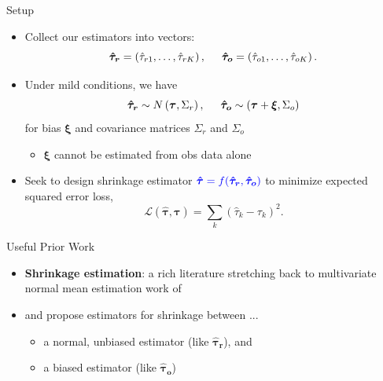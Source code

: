 \documentclass[usenames,dvipsnames]{beamer}
\newcommand{\bstau}{\boldsymbol{\tau}}
\newcommand{\hbstau}{\boldsymbol{\hat \tau}}
\newcommand{\htaur}{\boldsymbol{\hat \tau_r}}
\newcommand{\htauo}{\boldsymbol{\hat \tau_o}}
\let\oldcite=\cite
\renewcommand{\cite}[1]{\textcolor[rgb]{.3,.3,.8}{\oldcite{#1}}}
\theoremstyle{definition} %
\begin{document}
\begin{frame}{Setup}
\begin{itemize}
\item Collect our estimators into vectors:
\[\boldsymbol{\hat \tau_r }= \left(\hat \tau_{r1}, \dots, \hat \tau_{rK} \right), \hspace{5mm}   \boldsymbol{\hat \tau_{o}} = \left(\hat \tau_{o1}, \dots, \hat \tau_{oK} \right). \] \pause
\item Under mild conditions, we have 
\[ \boldsymbol{\hat \tau_{r}} \sim N\left( \boldsymbol{\tau}, \Sigma_r \right) , \hspace{5mm}  \boldsymbol{\hat \tau_{o}} \sim \left( \boldsymbol{\tau} + \boldsymbol{\xi}, \Sigma_o \right) \] 
for bias $\boldsymbol{\xi}$ and covariance matrices $\Sigma_r$ and $\Sigma_o$
\begin{itemize}
\item $\boldsymbol{\xi}$ cannot be estimated from obs data alone
\end{itemize} \pause
\item Seek to design shrinkage estimator $\color{blue} \hbstau = f(\boldsymbol{\hat \tau_r },  \boldsymbol{\hat \tau_{o}})\color{black}$ to minimize expected squared error loss,
\[ \mathcal{L}(\hbstau, \bstau) =  \sum_k  \left( \hat \tau_k - \tau_k \right)^2. \] 
\end{itemize}
\end{frame}


\begin{frame}{Useful Prior Work}
\begin{itemize}
\item \textbf{Shrinkage estimation}: a rich literature stretching back to multivariate normal mean estimation work of \cite{stein1956inadmissibility}
\item \cite{green1991james} and \cite{green2005improved} propose estimators for shrinkage between ... 
\begin{itemize}
\item a normal, unbiased estimator (like $\htaur$), and 
\item a biased estimator (like $\htauo$)
\end{itemize}
\vspace{3mm}
\end{itemize}
\end{frame}
\end{document}
